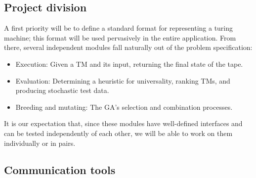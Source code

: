 \subsection{Project division}

A first priority will be to define a standard format for representing a turing machine; this format will be used pervasively in the entire application. From there, several independent modules fall naturally out of the problem specification:

\begin{itemize}
\item Execution: Given a TM and its input, returning the final state of the tape.
\item Evaluation: Determining a heuristic for universality, ranking TMs, and producing stochastic test data.
\item Breeding and mutating: The GA's selection and combination processes.
\end{itemize}

It is our expectation that, since these modules have well-defined interfaces and can be tested independently of each other, we will be able to work on them individually or in pairs.

\subsection{Communication tools}
